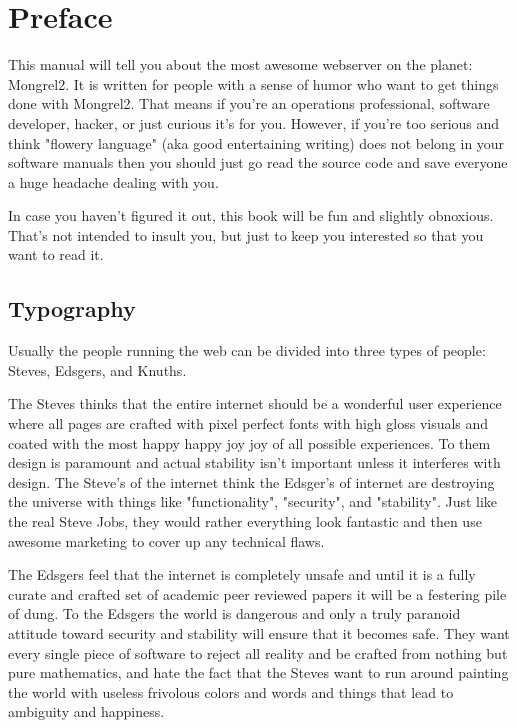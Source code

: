 \chapter*{Preface}

This manual will tell you about the most awesome webserver on the planet: Mongrel2.
It is written for people with a sense of humor who want to get things done with Mongrel2.
That means if you're an operations professional, software developer, hacker, or just
curious it's for you.  However, if you're too serious and think "flowery language"
(aka good entertaining writing) does not belong in your software manuals then you should just
go read the source code and save everyone a huge headache dealing with you.

In case you haven't figured it out, this book will be fun and slightly obnoxious.  That's
not intended to insult you, but just to keep you interested so that you want to read it.


\section*{Typography}

Usually the people running the web can be divided into three types of people:  Steves,
Edsgers, and Knuths.

The Steves thinks that the entire internet should be a wonderful user
experience where all pages are crafted with pixel perfect fonts with high gloss
visuals and coated with the most happy happy joy joy of all possible
experiences.  To them design is paramount and actual stability isn't important
unless it interferes with design.  The Steve's of the internet think the
Edsger's of internet are destroying the universe with things like
"functionality", "security", and "stability".  Just like the real Steve Jobs, they
would rather everything look fantastic and then use awesome marketing to cover
up any technical flaws.

The Edsgers feel that the internet is completely unsafe and until it is a fully curate and crafted
set of academic peer reviewed papers it will be a festering pile of dung.  To the Edsgers
the world is dangerous and only a truly paranoid attitude toward security and stability will ensure
that it becomes safe.  They want every single piece of software to reject all reality and be crafted
from nothing but pure mathematics, and hate the fact that the Steves want to run around painting
the world with useless frivolous colors and words and things that lead to ambiguity and happiness.

